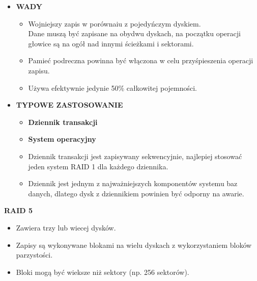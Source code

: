 \documentclass[a5paper,6pt]{article}
\begin{document}
\begin{itemize}
        \item \textbf{WADY}
        \begin{itemize}
            \item Wojniejszy zapis w porównaiu z pojedyńczym dyskiem.\\
                  Dane muszą być zapisane na obydwu dyskach, na początku
                  operacji głowice są na ogół nad innymi ścieżkami i sektorami.
            \item Pamieć podreczna powinna być włączona w celu przyśpieszenia
                  operacji zapisu.
            \item Używa efektywnie jedynie 50\% całkowitej pojemności.
        \end{itemize}

        \item \textbf{TYPOWE ZASTOSOWANIE}
        \begin{itemize}
            \item \textbf{Dziennik transakcji}
            \item \textbf{System operacyjny}
            \item Dziennik transakcji jest zapisywany sekwencyjnie, najlepiej
                  stosować jeden system RAID 1 dla każdego dziennika.
            \item Dziennik jest jednym z najważniejszych komponentów systemu
                  baz danych, dlatego dysk z dziennikiem powinien być odporny
                  na awarie.
        \end{itemize}

    \end{itemize}

    \textbf{RAID 5}
    \begin{itemize}
        \item Zawiera trzy lub wiecej dysków.
        \item Zapisy są wykonywane blokami na wielu dyskach z wykorzystaniem
              bloków parzystości.
        \item Bloki mogą być wieksze niż sektory (np. 256 sektorów).
    \end{itemize}
\end{document}
